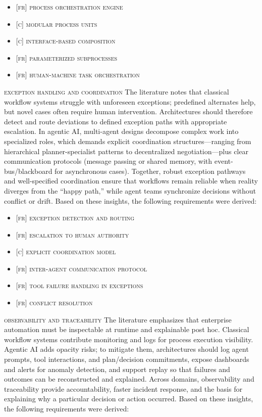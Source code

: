 \begin{itemize}
  \item \textsc{[fr] process orchestration engine}
  \item \textsc{[c] modular process units}
  \item \textsc{[c] interface-based composition}
  \item \textsc{[fr] parameterized subprocesses}
  \item \textsc{[fr] human-machine task orchestration}
\end{itemize}

\noindent \textsc{exception handling and coordination} \quad The literature notes that classical workflow systems struggle with unforeseen exceptions; predefined alternates help, but novel cases often require human intervention. Architectures should therefore detect and route deviations to defined exception paths with appropriate escalation. In agentic AI, multi-agent designs decompose complex work into specialized roles, which demands explicit coordination structures—ranging from hierarchical planner-specialist patterns to decentralized negotiation—plus clear communication protocols (message passing or shared memory, with event-bus/blackboard for asynchronous cases). Together, robust exception pathways and well-specified coordination ensure that workflows remain reliable when reality diverges from the “happy path,” while agent teams synchronize decisions without conflict or drift. Based on these insights, the following requirements were derived:

\begin{itemize}
  \item \textsc{[fr] exception detection and routing}
  \item \textsc{[fr] escalation to human authority}
  \item \textsc{[c] explicit coordination model}
  \item \textsc{[fr] inter-agent communication protocol}
  \item \textsc{[fr] tool failure handling in exceptions}
  \item \textsc{[fr] conflict resolution}
\end{itemize}

\noindent \textsc{observability and traceability} \quad The literature emphasizes that enterprise automation must be inspectable at runtime and explainable post hoc. Classical workflow systems contribute monitoring and logs for process execution visibility. Agentic AI adds opacity risks; to mitigate them, architectures should log agent prompts, tool interactions, and plan/decision commitments, expose dashboards and alerts for anomaly detection, and support replay so that failures and outcomes can be reconstructed and explained. Across domains, observability and traceability provide accountability, faster incident response, and the basis for explaining why a particular decision or action occurred. Based on these insights, the following requirements were derived:

